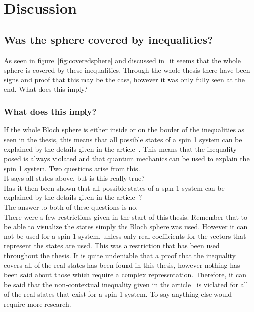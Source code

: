\chapter{Discussion}\label{cha:discussion}
\newpage
\section{Was the sphere covered by inequalities?}
As seen in figure~\ref{fig:coveredsphere} and discussed in~ it seems that the whole sphere is covered by these inequalities. Through the whole thesis there have been signs and proof that this may be the case, however it was only fully seen at the end. What does this imply? 
\subsection{What does this imply?}
If the whole Bloch sphere is either inside or on the border of the inequalities as seen in the thesis, this means that all possible states of a spin 1 system can be explained by the details given in the article~\cite{PhysRevLett.101.020403}. This means that the inequality posed is always violated  and that quantum mechanics can be used to explain the spin 1 system.
Two questions arise from this.\\
It says all states above, but is this really true?\\
Has it then been shown that all possible states of a spin 1 system can be explained by the details given in the article~\cite{PhysRevLett.101.020403}?\\
The answer to both of these questions is no.\\
There were a few restrictions given in the start of this thesis. Remember that to be able to visualize the states simply the Bloch sphere was used. However it can not be used for a spin 1 system, unless only real coefficients for the vectors that represent the states are used. This was a restriction that has been used throughout the thesis. It is quite undeniable that a proof that the inequality covers all of the real states has been found in this thesis, however nothing has been said about those which require a complex representation. Therefore, it can be said that the non-contextual inequality given in the article~\cite{PhysRevLett.101.020403} is violated for all of the real states that exist for a spin 1 system. To say anything else would require more research.

